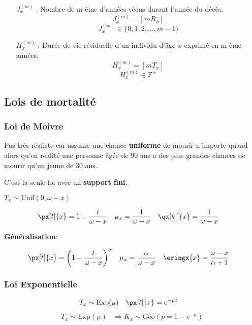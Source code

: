 \documentclass[10pt, french]{article}
\begin{document}
\begin{multicols*}{3}
\begin{itemize}
\item[$J^{(m)}_x$ : ] Nombre de m-ème d'années vécus durant l'année du décès.
\[J^{(m)}_x= [m R_x] \]
\[J^{(m)}_x \in \{0, 1, 2, \dots, m - 1) \]

\item[$H^{(m)}_x$ : ] Durée de vie résiduelle d'un individu d'âge $x$ exprimé en m-ème années.
\[H^{(m)}_x= [m T_x] \]
\[H^{(m)}_x \in \mathbb{Z}^+ \]


\end{itemize}

\subsection{Lois de mortalité}
\subsubsection*{Loi de Moivre}
Pas très réaliste car assume une chance \textbf{uniforme} de mourir n'importe quand alors qu'en réalité une personne âgée de 90 ans a des plus grandes chances de mourir qu'un jeune de 30 ans.
 
C'est la seule loi avec un \textbf{support fini}. 

\begin{center}
$T_x \sim	\text{Unif}(0, \omega - x)$

\begin{align*}
	\px[t]{x} 
		&= 	1 - \frac{t}{\omega - x} &
	\mu_x 
		&=	\frac{1}{\omega - x}	&
	\qx[k |]{x} 
		&=	\frac{1}{\omega - x}
\end{align*}
\end{center}

\textbf{Généralisation}:

\begin{align*}
	\px[t]{x} 
		&= \left( 1 - \frac{t}{\omega - x} \right)^{\alpha} &
	\mu_x &=	\frac{\alpha}{\omega - x}	&
	\eringx{x}	&=	\frac{\omega - x}{\alpha + 1}
\end{align*}

\subsubsection*{Loi Exponentielle}

\begin{center}
\begin{align*}
	T_x 			&\sim 	\mathrm{Exp}(\mu) &
	\px[t]{x} 	&= 		e^{-\mu t}	
\end{align*}
\begin{align*}
	T_x \sim \text{Exp}(\mu) &\Rightarrow K_x \sim \text{Géo}(p = 1 - e^{-\mu}) 
\end{align*}
\end{center}


\end{multicols*}
\end{document}
